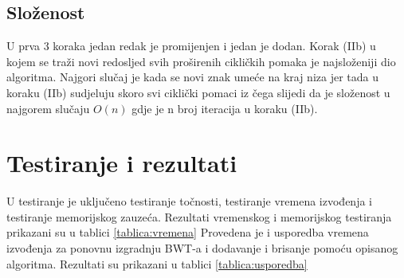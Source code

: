 \documentclass{ferseminar}
\begin{document}
\subsection{Složenost}
U prva 3 koraka jedan redak je promijenjen i jedan je dodan. Korak (IIb) u kojem se traži novi redosljed svih proširenih cikličkih pomaka je najsloženiji dio algoritma. Najgori slučaj je kada se novi znak umeće na kraj niza jer tada u koraku (IIb) sudjeluju skoro svi ciklički pomaci iz čega slijedi da je složenost u najgorem slučaju $O(n)$ gdje je n broj iteracija u koraku (IIb).

\section{Testiranje i rezultati}
U testiranje je uključeno testiranje točnosti, testiranje vremena izvođenja i testiranje memorijskog zauzeća. Rezultati vremenskog i memorijskog testiranja prikazani su u tablici \ref{tablica:vremena} Provedena je i usporedba vremena izvođenja za ponovnu izgradnju BWT-a i dodavanje i brisanje pomoću opisanog algoritma. Rezultati su prikazani u tablici \ref{tablica:usporedba}
\end{document}
